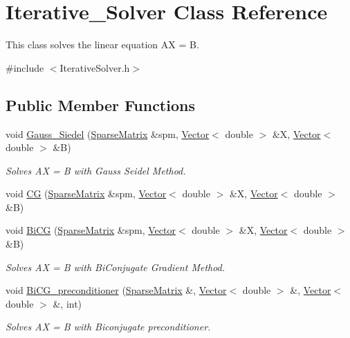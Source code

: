 \hypertarget{class_iterative___solver}{}\section{Iterative\+\_\+\+Solver Class Reference}
\label{class_iterative___solver}


This class solves the linear equation A\+X = B.  




{\ttfamily \#include $<$Iterative\+Solver.\+h$>$}

\subsection*{Public Member Functions}
\begin{DoxyCompactItemize}
\item 
void \hyperlink{class_iterative___solver_a5f6fa52bb561e2bc9bb4fee12304de2e}{Gauss\+\_\+\+Siedel} (\hyperlink{class_sparse_matrix}{Sparse\+Matrix} \&spm, \hyperlink{class_vector}{Vector}$<$ double $>$ \&X, \hyperlink{class_vector}{Vector}$<$ double $>$ \&B)
\begin{DoxyCompactList}\small\item\em Solves A\+X = B with Gauss Seidel Method. \end{DoxyCompactList}\item 
void \hyperlink{class_iterative___solver_a1ce6f374949235fc666cc9ad7f958c33}{C\+G} (\hyperlink{class_sparse_matrix}{Sparse\+Matrix} \&spm, \hyperlink{class_vector}{Vector}$<$ double $>$ \&X, \hyperlink{class_vector}{Vector}$<$ double $>$ \&B)
\item 
void \hyperlink{class_iterative___solver_abec8727d865cd322af371d191671e98f}{Bi\+C\+G} (\hyperlink{class_sparse_matrix}{Sparse\+Matrix} \&spm, \hyperlink{class_vector}{Vector}$<$ double $>$ \&X, \hyperlink{class_vector}{Vector}$<$ double $>$ \&B)
\begin{DoxyCompactList}\small\item\em Solves A\+X = B with Bi\+Conjugate Gradient Method. \end{DoxyCompactList}\item 
void \hyperlink{class_iterative___solver_a053c9f6e2b9b0920c97f977b5614aac6}{Bi\+C\+G\+\_\+preconditioner} (\hyperlink{class_sparse_matrix}{Sparse\+Matrix} \&, \hyperlink{class_vector}{Vector}$<$ double $>$ \&, \hyperlink{class_vector}{Vector}$<$ double $>$ \&, int)
\begin{DoxyCompactList}\small\item\em Solves A\+X = B with Biconjugate preconditioner. \end{DoxyCompactList}\end{DoxyCompactItemize}
